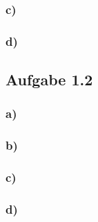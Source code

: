 \documentclass[11pt]{article}
\begin{document}
\subsubsection*{c)}
\subsubsection*{d)}
\subsection*{Aufgabe 1.2}
\subsubsection*{a)}
\subsubsection*{b)}
\subsubsection*{c)}
\subsubsection*{d)}

\end{document}
